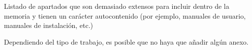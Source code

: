 \documentclass[ENG, BIB]{TFUOC}%
\begin{document}


\printglossary[title=Glossary, toctitle=Glossary]
\printglossary[type=\acronymtype, title=Acronyms, toctitle=Acronyms]



\printbibliography[heading=bibintoc]


\newpage
\appendix
Listado de apartados que son demasiado extensos para incluir dentro de la memoria y tienen un carácter autocontenido (por ejemplo, manuales de usuario, manuales de instalación, etc.)
 
Dependiendo del tipo de trabajo, es posible que no haya que añadir algún anexo.
\end{document}
